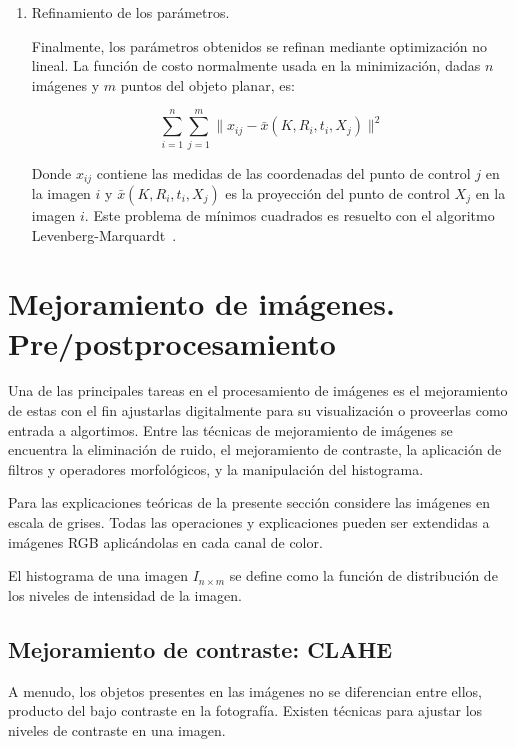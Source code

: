 \begin{enumerate}
	\item Refinamiento de los parámetros.
	
	Finalmente, los parámetros obtenidos se refinan mediante optimización no lineal. La función de costo normalmente usada en la minimización, dadas $n$ imágenes y $m$ puntos del objeto planar, es:
	
	\begin{equation}
		\sum_{i=1}^n\sum_{j=1}^m \|x_{ij} - \bar{x}(K, R_i, t_i, X_j)\|^2
	\end{equation}

	Donde $x_{ij}$ contiene las medidas de las coordenadas del punto de control $j$ en la imagen $i$ y $\bar{x}(K, R_i, t_i, X_j)$ es la proyección del punto de control $X_j$ en la imagen $i$. Este problema de mínimos cuadrados es resuelto con el algoritmo Levenberg-Marquardt~\cite{more1978levenberg}.
\end{enumerate}

\section{Mejoramiento de imágenes. Pre/postprocesamiento}\label{section:imgEnh}

Una de las principales tareas en el procesamiento de imágenes es el mejoramiento de estas con el fin ajustarlas digitalmente para su visualización o proveerlas como entrada a algortimos. Entre las técnicas de mejoramiento de imágenes se encuentra la eliminación de ruido, el mejoramiento de contraste, la aplicación de filtros y operadores morfológicos, y la manipulación del histograma.

Para las explicaciones teóricas de la presente sección considere las imágenes en escala de grises. Todas las operaciones y explicaciones pueden ser extendidas a imágenes RGB aplicándolas en cada canal de color.

\begin{definition}
	El histograma de una imagen $I_{n \times m}$ se define como la función de distribución de los niveles de intensidad de la imagen.
\end{definition}

\subsection{Mejoramiento de contraste: CLAHE}

A menudo, los objetos presentes en las imágenes no se diferencian entre ellos, producto del bajo contraste en la fotografía. Existen técnicas para ajustar los niveles de contraste en una imagen.

